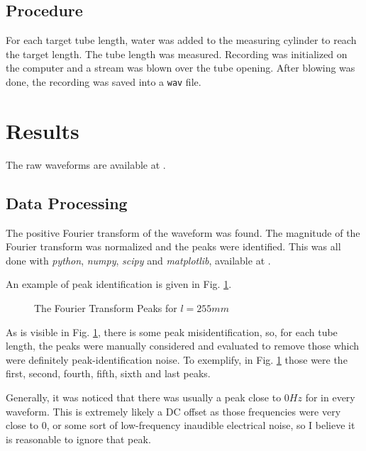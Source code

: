 \documentclass[conference]{IEEEtran}
\begin{document}
\subsection{Procedure}

For each target tube length, water was added to the measuring cylinder to reach
the target length. The tube length was measured. Recording was initialized on
the computer and a stream was blown over the tube opening. After blowing was
done, the recording was saved into a \texttt{wav} file.

\section{Results}

The raw waveforms are available at \cite{raw-waveforms}.

\subsection{Data Processing}

The positive Fourier transform of the waveform was found. The magnitude of the
Fourier transform was normalized and the peaks were identified. This was all
done with \textit{python}\cite{python}, \textit{numpy}\cite{numpy},
\textit{scipy}\cite{scipy} and \textit{matplotlib}\cite{matplotlib}, available
at \cite{raw-waveforms}.

An example of peak identification is given in Fig. \ref{fig:peaks-identified}.

\begin{figure}[b!]
    \centering
    
    \caption{The Fourier Transform Peaks for $l=255\si{mm}$}
    \label{fig:peaks-identified}
\end{figure}

As is visible in Fig. \ref{fig:peaks-identified}, there is some peak
misidentification, so, for each tube length, the peaks were manually considered
and evaluated to remove those which were definitely peak-identification noise.
To exemplify, in Fig. \ref{fig:peaks-identified} those were the first, second,
fourth, fifth, sixth and last peaks.

Generally, it was noticed that there was usually a peak close to $0\si{Hz}$ for
in every waveform. This is extremely likely a DC offset as those frequencies 
were very close to $0$, or some sort of low-frequency inaudible electrical
noise, so I believe it is reasonable to ignore that peak.
\end{document}
